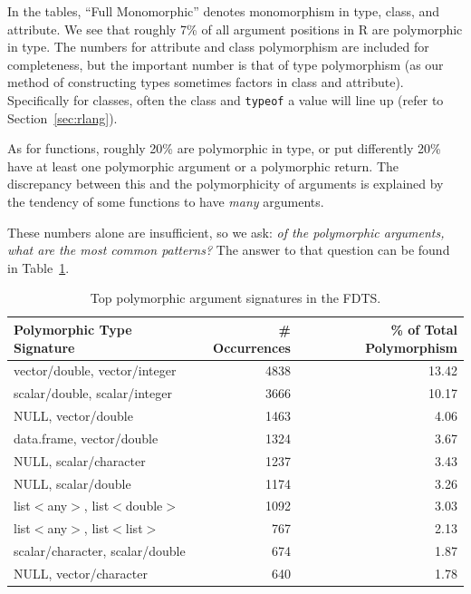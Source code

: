 \documentclass[acmsmall,10pt,review,anonymous]{acmart}\settopmatter{printfolios=true,printccs=false,printacmref=false}
\newcommand{\code}[1]{\lstinline|#1|\xspace}
\begin{document}

In the tables, ``Full Monomorphic'' denotes monomorphism in type, class, and attribute.
We see that roughly 7\% of all argument positions in R are polymorphic in type.
The numbers for attribute and class polymorphism are included for
completeness, but the important number is that of type polymorphism (as our
method of constructing types sometimes factors in class and attribute).
Specifically for classes, often the class and \code{typeof} a value will
line up (refer to Section~\ref{sec:rlang}).

As for functions, roughly 20\% are polymorphic in type, or put differently 20\% have at least one polymorphic argument or a polymorphic return.
The discrepancy between this and the polymorphicity of arguments is explained by the tendency of some functions to have {\it many} arguments.

These numbers alone are insufficient, so we ask: {\it of the polymorphic arguments, what are the most common patterns?}
The answer to that question can be found in Table~\ref{tab:toppolyFDTS}.

\begin{table}[ht]
\label{tab:toppolyFDTS}
\centering
\begin{tabular}{lrr}
  \hline
 Polymorphic Type Signature & \# Occurrences & \% of Total Polymorphism \\ 
  \hline
  vector/double, vector/integer & 4838 & 13.42 \\ 
  scalar/double, scalar/integer & 3666 & 10.17 \\ 
  NULL, vector/double & 1463 & 4.06 \\ 
  data.frame, vector/double & 1324 & 3.67 \\ 
  NULL, scalar/character & 1237 & 3.43 \\ 
   NULL, scalar/double & 1174 & 3.26 \\ 
   list$<$any$>$, list$<$double$>$ & 1092 & 3.03 \\ 
   list$<$any$>$, list$<$list$>$ & 767 & 2.13 \\ 
   scalar/character, scalar/double & 674 & 1.87 \\ 
   NULL, vector/character & 640 & 1.78 \\ 
     \hline
\end{tabular}
\caption{Top polymorphic argument signatures in the FDTS.}
\end{table}
\end{document}
